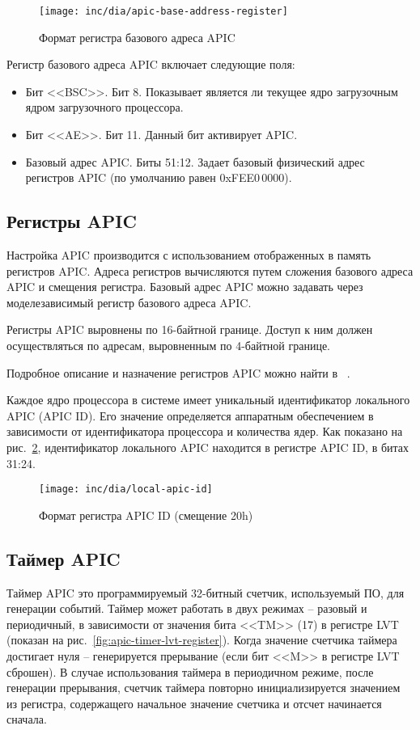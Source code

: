 \begin{figure}[ht!]
  \centering
  \texttt{[image: inc/dia/apic-base-address-register]}
  \caption{Формат регистра базового адреса APIC}
  \label{fig:apic-base-address-register}
\end{figure}

Регистр базового адреса APIC включает следующие поля:
\begin{itemize}
\item Бит <<BSC>>. Бит 8. Показывает является ли текущее ядро загрузочным ядром загрузочного процессора.
\item Бит <<AE>>. Бит 11. Данный бит активирует APIC.
\item Базовый адрес APIC. Биты 51:12. Задает базовый физический адрес регистров APIC (по умолчанию
	равен 0xFEE0\,0000).
\end{itemize}

\subsection{Регистры APIC}
Настройка APIC производится с использованием отображенных в память регистров APIC.
Адреса регистров вычисляются путем сложения базового адреса APIC и смещения регистра.
Базовый адрес APIC можно задавать через моделезависимый регистр базового адреса APIC.

Регистры APIC выровнены по 16-байтной границе. Доступ к ним должен осуществляться
по адресам, выровненным по 4-байтной границе.

Подробное описание и назначение регистров APIC можно найти в ~\cite{amd_pm_v2}.

Каждое ядро процессора в системе имеет уникальный идентификатор локального APIC (APIC ID).
Его значение определяется аппаратным обеспечением в зависимости от идентификатора процессора
и количества ядер. Как показано на рис.~\ref{fig:local-apic-id}, идентификатор локального APIC
находится в регистре APIC ID, в битах 31:24.

\begin{figure}[ht!]
  \centering
  \texttt{[image: inc/dia/local-apic-id]}
  \caption{Формат регистра APIC ID (смещение 20h)}
  \label{fig:local-apic-id}
\end{figure}

\subsection{Таймер APIC}
Таймер APIC это программируемый 32-битный счетчик, используемый ПО, для генерации событий.
Таймер может работать в двух режимах -- разовый и периодичный, в зависимости от значения бита <<TM>> (17)
в регистре LVT (показан на рис.~\ref{fig:apic-timer-lvt-register}). Когда значение счетчика таймера
достигает нуля -- генерируется прерывание (если бит <<M>> в регистре LVT сброшен). В случае использования
таймера в периодичном режиме, после генерации прерывания, счетчик таймера повторно инициализируется
значением из регистра, содержащего начальное значение счетчика и отсчет начинается сначала.

